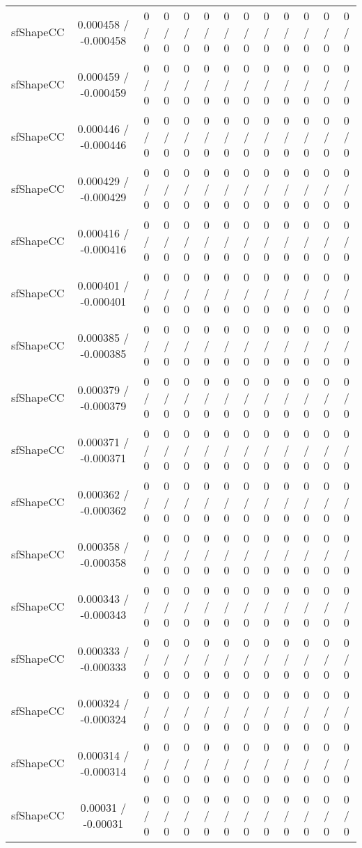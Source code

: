 \documentclass[10pt]{article}
\begin{document}
\begin{table}[htbp]
\begin{center}
\begin{tabular}{|c|c|c|c|c|c|c|c|c|c|c|c|c|}
  sfShapeCC & 0.000458 / -0.000458 & 0 / 0 & 0 / 0 & 0 / 0 & 0 / 0 & 0 / 0 & 0 / 0 & 0 / 0 & 0 / 0 & 0 / 0 & 0 / 0 & 0 / 0 \\ 
  sfShapeCC & 0.000459 / -0.000459 & 0 / 0 & 0 / 0 & 0 / 0 & 0 / 0 & 0 / 0 & 0 / 0 & 0 / 0 & 0 / 0 & 0 / 0 & 0 / 0 & 0 / 0 \\ 
  sfShapeCC & 0.000446 / -0.000446 & 0 / 0 & 0 / 0 & 0 / 0 & 0 / 0 & 0 / 0 & 0 / 0 & 0 / 0 & 0 / 0 & 0 / 0 & 0 / 0 & 0 / 0 \\ 
  sfShapeCC & 0.000429 / -0.000429 & 0 / 0 & 0 / 0 & 0 / 0 & 0 / 0 & 0 / 0 & 0 / 0 & 0 / 0 & 0 / 0 & 0 / 0 & 0 / 0 & 0 / 0 \\ 
  sfShapeCC & 0.000416 / -0.000416 & 0 / 0 & 0 / 0 & 0 / 0 & 0 / 0 & 0 / 0 & 0 / 0 & 0 / 0 & 0 / 0 & 0 / 0 & 0 / 0 & 0 / 0 \\ 
  sfShapeCC & 0.000401 / -0.000401 & 0 / 0 & 0 / 0 & 0 / 0 & 0 / 0 & 0 / 0 & 0 / 0 & 0 / 0 & 0 / 0 & 0 / 0 & 0 / 0 & 0 / 0 \\ 
  sfShapeCC & 0.000385 / -0.000385 & 0 / 0 & 0 / 0 & 0 / 0 & 0 / 0 & 0 / 0 & 0 / 0 & 0 / 0 & 0 / 0 & 0 / 0 & 0 / 0 & 0 / 0 \\ 
  sfShapeCC & 0.000379 / -0.000379 & 0 / 0 & 0 / 0 & 0 / 0 & 0 / 0 & 0 / 0 & 0 / 0 & 0 / 0 & 0 / 0 & 0 / 0 & 0 / 0 & 0 / 0 \\ 
  sfShapeCC & 0.000371 / -0.000371 & 0 / 0 & 0 / 0 & 0 / 0 & 0 / 0 & 0 / 0 & 0 / 0 & 0 / 0 & 0 / 0 & 0 / 0 & 0 / 0 & 0 / 0 \\ 
  sfShapeCC & 0.000362 / -0.000362 & 0 / 0 & 0 / 0 & 0 / 0 & 0 / 0 & 0 / 0 & 0 / 0 & 0 / 0 & 0 / 0 & 0 / 0 & 0 / 0 & 0 / 0 \\ 
  sfShapeCC & 0.000358 / -0.000358 & 0 / 0 & 0 / 0 & 0 / 0 & 0 / 0 & 0 / 0 & 0 / 0 & 0 / 0 & 0 / 0 & 0 / 0 & 0 / 0 & 0 / 0 \\ 
  sfShapeCC & 0.000343 / -0.000343 & 0 / 0 & 0 / 0 & 0 / 0 & 0 / 0 & 0 / 0 & 0 / 0 & 0 / 0 & 0 / 0 & 0 / 0 & 0 / 0 & 0 / 0 \\ 
  sfShapeCC & 0.000333 / -0.000333 & 0 / 0 & 0 / 0 & 0 / 0 & 0 / 0 & 0 / 0 & 0 / 0 & 0 / 0 & 0 / 0 & 0 / 0 & 0 / 0 & 0 / 0 \\ 
  sfShapeCC & 0.000324 / -0.000324 & 0 / 0 & 0 / 0 & 0 / 0 & 0 / 0 & 0 / 0 & 0 / 0 & 0 / 0 & 0 / 0 & 0 / 0 & 0 / 0 & 0 / 0 \\ 
  sfShapeCC & 0.000314 / -0.000314 & 0 / 0 & 0 / 0 & 0 / 0 & 0 / 0 & 0 / 0 & 0 / 0 & 0 / 0 & 0 / 0 & 0 / 0 & 0 / 0 & 0 / 0 \\ 
  sfShapeCC & 0.00031 / -0.00031 & 0 / 0 & 0 / 0 & 0 / 0 & 0 / 0 & 0 / 0 & 0 / 0 & 0 / 0 & 0 / 0 & 0 / 0 & 0 / 0 & 0 / 0 \\ 

\end{tabular}
\end{center}
\end{table}
\end{document}

